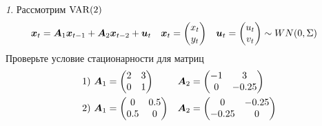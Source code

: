\documentclass[12pt]{article}
\theoremstyle{remark}
\newtheorem{exercise}{}[subsection]
\begin{document}
\begin{exercise}
Рассмотрим $\operatorname{VAR}(2)$
\begin{align*}
	{\bm x}_t&={\bm A}_1{\bm x}_{t-1}+{\bm A}_2{\bm x}_{t-2}+{\bm u}_t &
	{\bm x}_t&=\begin{pmatrix} x_t \\ y_t \end{pmatrix} &
	{\bm u}_t&=\begin{pmatrix} u_t \\ v_t \end{pmatrix}\sim
	WN(0,\Sigma)
\end{align*}
Проверьте условие стационарности для матриц
\begin{align*}
	1)\,\,{\bm A}_1&=\begin{pmatrix} 2 & 3 \\ 0 & 1 \end{pmatrix} &
	{\bm A}_2&=\begin{pmatrix} -1 & 3 \\ 0 & -0.25 \end{pmatrix} \\
	2)\,\,{\bm A}_1&=\begin{pmatrix} 0 & 0.5 \\ 0.5 & 0 \end{pmatrix} &
	{\bm A}_2&=\begin{pmatrix} 0 & -0.25 \\ -0.25 & 0 \end{pmatrix}
\end{align*}
\end{exercise}
	
\end{document}
